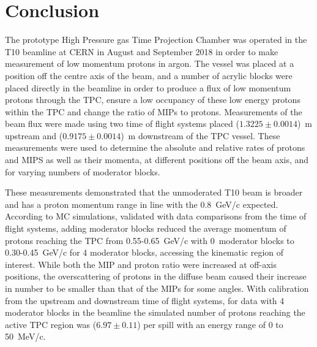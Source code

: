 \section{Conclusion}
\label{hptpcPaper:sec:Conclusion}

The prototype High Pressure gas Time Projection Chamber was operated in the T10 beamline at CERN in August and September 2018 in order to make measurement of low momentum protons in argon.
The vessel was placed at a position off the centre axis of the beam, and a number of acrylic blocks were placed directly in the beamline in order to produce a flux of low momentum protons through the TPC, ensure a low occupancy of these low energy protons within the TPC and change the ratio of MIPs to protons.
Measurements of the beam flux were made using two time of flight systems placed ($1.3225 \pm 0.0014$)~m upstream and ($0.9175 \pm 0.0014$)~m downstream of the TPC vessel.
These measurements were used to determine the absolute and relative rates of protons and MIPS as well as their momenta, at different positions off the beam axis, and for varying numbers of moderator blocks.

These measurements demonstrated that the unmoderated T10 beam is broader and has a proton momentum range in line with the 0.8~GeV/c expected.
According to MC simulations, validated with data comparisons from the time of flight systems, adding moderator blocks reduced the average momentum of protons reaching the TPC from 0.55-0.65~GeV/c with 0~moderator blocks to 0.30-0.45~GeV/c for 4 moderator blocks, accessing the kinematic region of interest.
While both the MIP and proton ratio were increased at off-axis positions, the overscattering of protons in the diffuse beam caused their increase in number to be smaller than that of the MIPs for some angles.
With calibration from the upstream and downstream time of flight systems, for data with 4 moderator blocks in the beamline the simulated number of protons reaching the active TPC region was ($6.97 \pm  0.11$) per spill with an energy range of 0 to 50~MeV/c.


